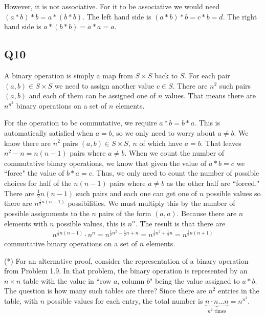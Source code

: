 \documentclass[12pt]{article}
\numberwithin{theorem}{section}
\numberwithin{equation}{section}
\numberwithin{remark}{section}
\numberwithin{definition}{section}
\numberwithin{theorem}{section}
\numberwithin{lemma}{section}
\numberwithin{example}{section}
\begin{document}
However, it is not associative. For it to be associative we would need $(a*b)*b=a*(b*b)$. The left hand side is $(a*b)*b=c*b=d$. The right hand side is $a*(b*b)=a*a=a$. 



\subsection{Q10}

A binary operation is simply a map from $S \times S$ back to $S$. For each pair $(a,b)\in S\times S$ we need to assign another value $c\in S$. There are $n^2$ such pairs $(a,b)$ and each of them can be assigned one of $n$ values. That means there are $n^{n^2}$ binary operations on a set of $n$ elements. 

For the operation to be commutative, we require $a * b = b * a$. This is automatically satisfied when $a=b$, so we only need to worry about $a\neq b$. We know there are $n^2$ pairs $(a,b)\in S \times S$, $n$ of which have $a=b$. That leaves $n^2-n=n(n-1)$ pairs where $a\neq b$. When we count the number of commutative binary operations, we know that given the value of $a * b = c$ we ``force" the value of $b * a = c$. Thus, we only need to count the number of possible choices for half of the $n(n-1)$ pairs where $a\neq b$ as the other half are ``forced." There are $\frac{1}{2}n(n-1)$ such pairs and each one can get one of $n$ possible values so there are $n^{\frac{1}{2}n(n-1)}$ possibilities. We must multiply this by the number of possible assignments to the $n$ pairs of the form $(a,a)$. Because there are $n$ elements with $n$ possible values, this is $n^n$. The result is that there are
\begin{align*}
	n^{\frac{1}{2}n(n-1)}\cdot n^n = n^{\frac{1}{2}n^2 - \frac{1}{2}n + n} = n^{\frac{1}{2}n^2 + \frac{1}{2}n} = n^{\frac{1}{2}n(n+1)}
\end{align*}
commutative binary operations on a set of $n$ elements. 

\vspace{\baselineskip}

\noindent (*) For an alternative proof, consider the representation of a binary operation from Problem 1.9. In that problem, the binary operation is represented by an $n\times n$ table with the value in ``row $a$, column $b$" being the value assigned to $a * b$. The question is how many such tables are there? Since there are $n^2$ entries in the table, with $n$ possible values for each entry, the total number is $\underbrace{n\cdot n \ldots n}_{n^2\text{ times}}=n^{n^2}$.
\end{document}
